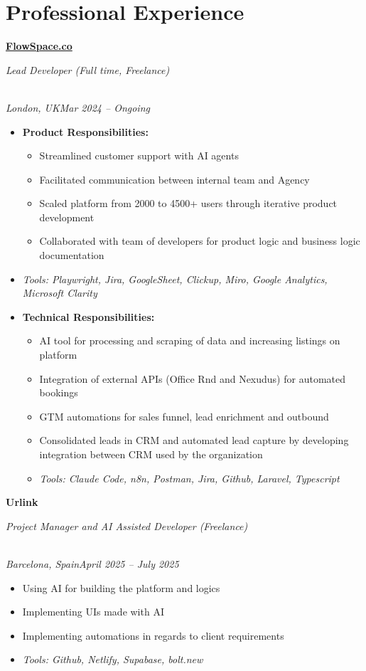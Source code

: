 \documentclass[a4paper,10pt]{article}
\newcommand{\role}[4]{\vspace{3pt}\noindent\hspace{0.6em}\parbox[t]{0.38\textwidth}{\raggedright\textbf{#1}}\hfill\parbox[t]{0.58\textwidth}{\raggedleft\textit{#2}}\\{\textit{#3}\hfill\textit{#4}}\vspace{1pt}}
\begin{document}
\section{Professional Experience}
\role{\href{https://flowspace.co}{FlowSpace.co}}{Lead Developer (Full time, Freelance)}{London, UK}{Mar 2024 -- Ongoing}
\begin{itemize}
\item \textbf{Product Responsibilities:}
\begin{itemize}[label=--]
\item Streamlined customer support with AI agents
\item Facilitated communication between internal team and Agency
\item Scaled platform from 2000 to 4500+ users through iterative product development
\item Collaborated with team of developers for product logic and business logic documentation
\end{itemize}
\item \textit{Tools: Playwright, Jira, GoogleSheet, Clickup, Miro, Google Analytics, Microsoft Clarity}
\item \textbf{Technical Responsibilities:}
\begin{itemize}[label=--]
\item AI tool for processing and scraping of data and increasing listings on platform
\item Integration of external APIs (Office Rnd and Nexudus) for automated bookings
\item GTM automations for sales funnel, lead enrichment and outbound
\item Consolidated leads in CRM and automated lead capture by developing integration between CRM used by the organization
\item \textit{Tools: Claude Code, n8n, Postman, Jira, Github, Laravel, Typescript}
\end{itemize}
\end{itemize}

\role{Urlink}{Project Manager and AI Assisted Developer (Freelance)}{Barcelona, Spain}{April 2025 -- July 2025}
\begin{itemize}
\item Using AI for building the platform and logics
\item Implementing UIs made with AI
\item Implementing automations in regards to client requirements
\item \textit{Tools: Github, Netlify, Supabase, bolt.new}
\end{itemize}
\end{document}
